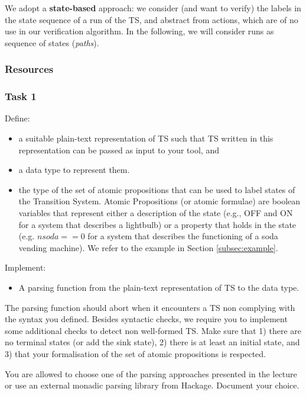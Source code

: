 \documentclass{article}
\begin{document}
We adopt a \textbf{state-based} approach: we consider (and want to verify) 
the labels in the state sequence of a run of the TS, and abstract from actions, 
which are of no use in our verification algorithm. In the following, we will consider
runs as sequence of states (\emph{paths}).

\subsubsection*{Resources}
\cite[Paragraph 2.1]{BaKa}

\color{red}
\subsubsection*{Task 1}
Define:
\begin{itemize}
    \item a suitable plain-text representation of TS such that TS written in this representation
          can be passed as input to your tool, and
    \item a data type to represent them. 
    \item the type of the set of atomic propositions that can be used to label states of the Transition System. 
            Atomic Propositions (or atomic formulae) are boolean variables that represent either
            a description of the state (e.g., OFF and ON for a system that describes a lightbulb) 
            or a property that holds in the state (e.g. $nsoda == 0$ for a system that describes the functioning 
            of a soda vending machine). We refer to the example in Section \ref{subsec:example}.
\end{itemize} 
Implement: 
\begin{itemize}
    \item A parsing function from the plain-text representation of TS to the data type.
\end{itemize}
The parsing function should abort when it encounters a TS non complying with the syntax you defined.
Besides syntactic checks, we require you to implement some additional checks to detect 
non well-formed TS. Make sure that 1) there are no terminal states (or add the sink state),
2) there is at least an initial state,
and 3) that your formalisation of the set of atomic propositions is respected. 

\color{black}

You are allowed to choose one of the parsing approaches presented in the lecture or 
use an external monadic parsing library from Hackage. Document your choice.
\end{document}
